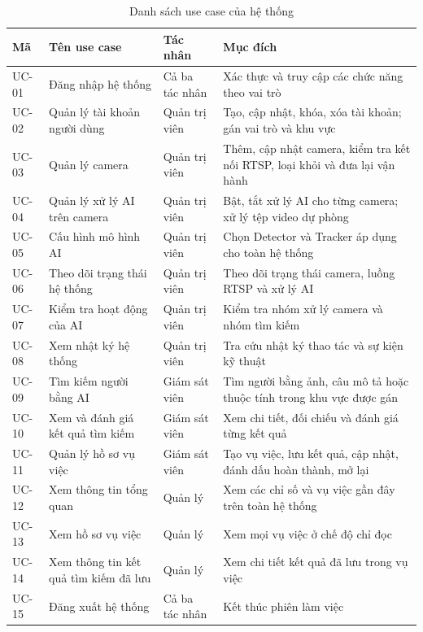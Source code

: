 \begin{table}[H]
\centering
\caption{Danh sách use case của hệ thống}
\label{tab:usecases}
\begin{tabularx}{\textwidth}{|>{\raggedright\arraybackslash}p{1.4cm}|>{\raggedright\arraybackslash}p{3.8cm}|>{\raggedright\arraybackslash}p{2.4cm}|L|}
\hline
\textbf{Mã} & \textbf{Tên use case} & \textbf{Tác nhân} & \textbf{Mục đích} \\
\hline
UC-01 & Đăng nhập hệ thống & Cả ba tác nhân & Xác thực và truy cập các chức năng theo vai trò \\
\hline
UC-02 & Quản lý tài khoản người dùng & Quản trị viên & Tạo, cập nhật, khóa, xóa tài khoản; gán vai trò và khu vực \\
\hline
UC-03 & Quản lý camera & Quản trị viên & Thêm, cập nhật camera, kiểm tra kết nối RTSP, loại khỏi và đưa lại vận hành \\
\hline
UC-04 & Quản lý xử lý AI trên camera & Quản trị viên & Bật, tắt xử lý AI cho từng camera; xử lý tệp video dự phòng \\
\hline
UC-05 & Cấu hình mô hình AI & Quản trị viên & Chọn Detector và Tracker áp dụng cho toàn hệ thống \\
\hline
UC-06 & Theo dõi trạng thái hệ thống & Quản trị viên & Theo dõi trạng thái camera, luồng RTSP và xử lý AI \\
\hline
UC-07 & Kiểm tra hoạt động của AI & Quản trị viên & Kiểm tra nhóm xử lý camera và nhóm tìm kiếm \\
\hline
UC-08 & Xem nhật ký hệ thống & Quản trị viên & Tra cứu nhật ký thao tác và sự kiện kỹ thuật \\
\hline
UC-09 & Tìm kiếm người bằng AI & Giám sát viên & Tìm người bằng ảnh, câu mô tả hoặc thuộc tính trong khu vực được gán \\
\hline
UC-10 & Xem và đánh giá kết quả tìm kiếm & Giám sát viên & Xem chi tiết, đối chiếu và đánh giá từng kết quả \\
\hline
UC-11 & Quản lý hồ sơ vụ việc & Giám sát viên & Tạo vụ việc, lưu kết quả, cập nhật, đánh dấu hoàn thành, mở lại \\
\hline
UC-12 & Xem thông tin tổng quan & Quản lý & Xem các chỉ số và vụ việc gần đây trên toàn hệ thống \\
\hline
UC-13 & Xem hồ sơ vụ việc & Quản lý & Xem mọi vụ việc ở chế độ chỉ đọc \\
\hline
UC-14 & Xem thông tin kết quả tìm kiếm đã lưu & Quản lý & Xem chi tiết kết quả đã lưu trong vụ việc \\
\hline
UC-15 & Đăng xuất hệ thống & Cả ba tác nhân & Kết thúc phiên làm việc \\
\hline
\end{tabularx}
\end{table}
